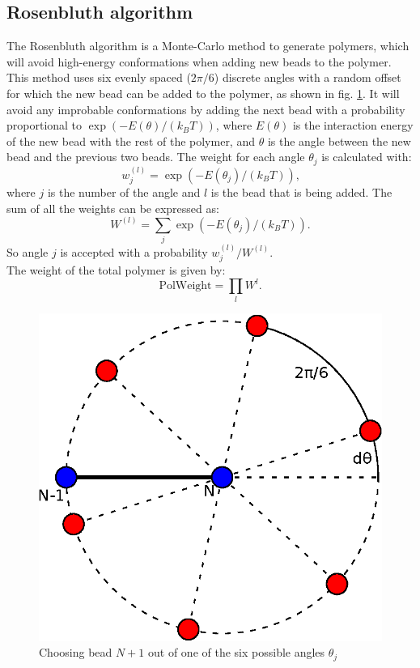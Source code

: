 \documentclass[a4paper,twocolumn]{article}
\begin{document}
\subsection{Rosenbluth algorithm}
The Rosenbluth algorithm is a Monte-Carlo method to generate polymers, which will avoid high-energy conformations when adding new beads to the polymer.\cite{rosenbluth} This method uses six evenly spaced ($2\pi /6$) discrete angles with a random offset for which the new bead can be added to the polymer, as shown in fig. \ref{fig:roulette}. It will avoid any improbable conformations by adding the next bead with a probability proportional to $\exp(-E(\theta)/(k_BT))$, where $E(\theta)$ is the interaction energy of the new bead with the rest of the polymer, and $\theta$ is the angle between the new bead and the previous two beads. The weight for each angle $\theta_j$ is calculated with:
\begin{equation}\label{eq:weight}
	w_j^{(l)}=\exp(-E(\theta_j)/(k_BT)) \text{,}
\end{equation}\label{eq:sumweight}
where $j$ is the number of the angle and $l$ is the bead that is being added. The sum of all the weights can be expressed as:
\begin{equation}
	W^{(l)}=\sum_j \exp(-E(\theta_j)/(k_BT)) \text{.}
\end{equation}
So angle $j$ is accepted with a probability $w_j^{(l)}/W^{(l)}$.\\
The weight of the total polymer is given by:
\begin{equation}\label{eq:polweight}
	\text{PolWeight}=\prod_l W^l\text{.}
\end{equation}

\begin{figure}
	\centering
	\includegraphics[width=0.5\linewidth]{roulette.eps}
	\caption{Choosing bead $N+1$ out of  one of the six possible angles $\theta_j$}
	\label{fig:roulette}
\end{figure}
\end{document}
